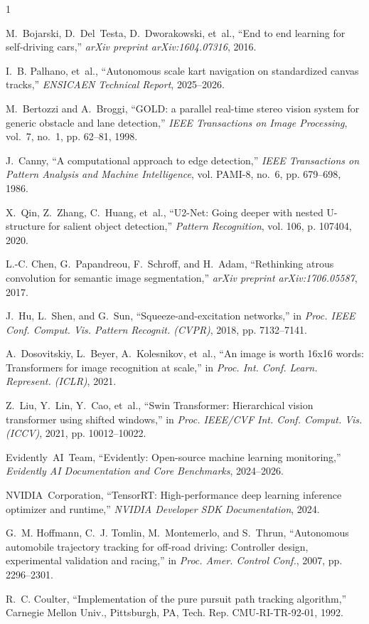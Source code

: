 \documentclass[10pt,journal,compsoc]{IEEEtran}
\begin{document}
\begin{thebibliography}{1}

M.~Bojarski, D.~Del~Testa, D.~Dworakowski, et~al., ``End to end learning for self-driving cars,'' \emph{arXiv preprint arXiv:1604.07316}, 2016.

I.~B. Palhano, et~al., ``Autonomous scale kart navigation on standardized canvas tracks,'' \emph{ENSICAEN Technical Report}, 2025--2026.

M.~Bertozzi and A.~Broggi, ``{GOLD}: a parallel real-time stereo vision system for generic obstacle and lane detection,'' \emph{IEEE Transactions on Image Processing}, vol.~7, no.~1, pp. 62--81, 1998.

J.~Canny, ``A computational approach to edge detection,'' \emph{IEEE Transactions on Pattern Analysis and Machine Intelligence}, vol. PAMI-8, no.~6, pp. 679--698, 1986.

X.~Qin, Z.~Zhang, C.~Huang, et~al., ``U2-Net: Going deeper with nested U-structure for salient object detection,'' \emph{Pattern Recognition}, vol. 106, p. 107404, 2020.

L.-C. Chen, G.~Papandreou, F.~Schroff, and H.~Adam, ``Rethinking atrous convolution for semantic image segmentation,'' \emph{arXiv preprint arXiv:1706.05587}, 2017.

J.~Hu, L.~Shen, and G.~Sun, ``Squeeze-and-excitation networks,'' in \emph{Proc. IEEE Conf. Comput. Vis. Pattern Recognit. (CVPR)}, 2018, pp. 7132--7141.

A.~Dosovitskiy, L.~Beyer, A.~Kolesnikov, et~al., ``An image is worth 16x16 words: Transformers for image recognition at scale,'' in \emph{Proc. Int. Conf. Learn. Represent. (ICLR)}, 2021.

Z.~Liu, Y.~Lin, Y.~Cao, et~al., ``Swin Transformer: Hierarchical vision transformer using shifted windows,'' in \emph{Proc. IEEE/CVF Int. Conf. Comput. Vis. (ICCV)}, 2021, pp. 10012--10022.

Evidently~AI~Team, ``Evidently: Open-source machine learning monitoring,'' \emph{Evidently AI Documentation and Core Benchmarks}, 2024--2026.

NVIDIA~Corporation, ``TensorRT: High-performance deep learning inference optimizer and runtime,'' \emph{NVIDIA Developer SDK Documentation}, 2024.

G.~M. Hoffmann, C.~J. Tomlin, M.~Montemerlo, and S.~Thrun, ``Autonomous automobile trajectory tracking for off-road driving: Controller design, experimental validation and racing,'' in \emph{Proc. Amer. Control Conf.}, 2007, pp. 2296--2301.

R.~C. Coulter, ``Implementation of the pure pursuit path tracking algorithm,'' Carnegie Mellon Univ., Pittsburgh, PA, Tech. Rep. CMU-RI-TR-92-01, 1992.

\end{thebibliography}
\end{document}
